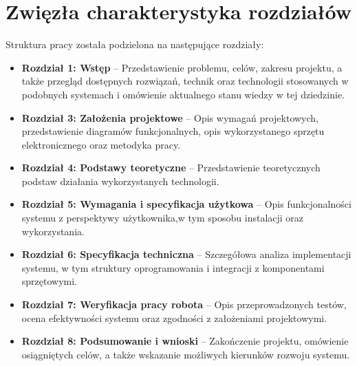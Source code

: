 \section{Zwięzła charakterystyka rozdziałów}
\label{sec:charakterystyka}

Struktura pracy została podzielona na następujące rozdziały:

\begin{itemize}
    \item \textbf{Rozdział 1: Wstęp} – Przedstawienie problemu, celów, zakresu projektu, a także przegląd dostępnych rozwiązań, technik oraz technologii stosowanych w podobnych systemach i omówienie aktualnego stanu wiedzy w tej dziedzinie.
    \item \textbf{Rozdział 3: Założenia projektowe} – Opis wymagań projektowych, przedstawienie diagramów funkcjonalnych, opis wykorzystanego sprzętu elektronicznego oraz metodyka pracy. 
    \item \textbf{Rozdział 4: Podstawy teoretyczne} – Przedstawienie teoretycznych podstaw działania wykorzystanych technologii. 
    \item \textbf{Rozdział 5: Wymagania i specyfikacja użytkowa} – Opis funkcjonalności systemu z perspektywy użytkownika,w tym sposobu instalacji oraz wykorzystania. 
    \item \textbf{Rozdział 6: Specyfikacja techniczna} – Szczegółowa analiza implementacji systemu, w tym struktury oprogramowania i integracji z komponentami sprzętowymi.
    \item \textbf{Rozdział 7: Weryfikacja pracy robota} – Opis przeprowadzonych testów, ocena efektywności systemu oraz zgodności z założeniami projektowymi.
    \item \textbf{Rozdział 8: Podsumowanie i wnioski} – Zakończenie projektu, omówienie osiągniętych celów, a także wskazanie możliwych kierunków rozwoju systemu.
\end{itemize}



